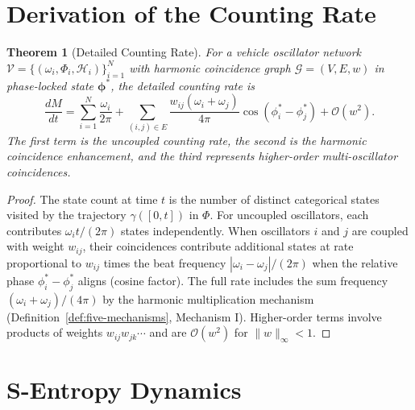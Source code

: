 \documentclass[twocolumn,10pt]{article}
\newtheorem{theorem}{Theorem}[section]
\theoremstyle{definition}
\theoremstyle{remark}
\newcommand{\Ocal}{\mathcal{O}}
\newcommand{\Gcal}{\mathcal{G}}
\begin{document}
\section{Derivation of the Counting Rate}\label{app:counting-rate}

\begin{theorem}[Detailed Counting Rate]\label{thm:detailed-rate}
For a vehicle oscillator network $\mathcal{V} = \{(\omega_i, \Phi_i,
\mathcal{H}_i)\}_{i=1}^{N}$ with harmonic coincidence graph
$\Gcal = (V, E, w)$ in phase-locked state $\bm{\phi}^*$, the detailed
counting rate is
\begin{equation}\label{eq:detailed-rate}
  \frac{dM}{dt} = \sum_{i=1}^{N} \frac{\omega_i}{2\pi}
  + \sum_{(i,j) \in E} \frac{w_{ij}(\omega_i + \omega_j)}{4\pi}
    \cos(\phi_i^* - \phi_j^*)
  + \Ocal(w^2).
\end{equation}
The first term is the uncoupled counting rate, the second is the
harmonic coincidence enhancement, and the third represents higher-order
multi-oscillator coincidences.
\end{theorem}

\begin{proof}
The state count at time $t$ is the number of distinct categorical states
visited by the trajectory $\gamma([0,t])$ in $\Phi$. For uncoupled
oscillators, each contributes $\omega_i t / (2\pi)$ states independently.
When oscillators $i$ and $j$ are coupled with weight $w_{ij}$, their
coincidences contribute additional states at rate proportional to
$w_{ij}$ times the beat frequency $|\omega_i - \omega_j|/(2\pi)$ when
the relative phase $\phi_i^* - \phi_j^*$ aligns (cosine factor). The
full rate includes the sum frequency $(\omega_i + \omega_j)/(4\pi)$ by
the harmonic multiplication mechanism
(Definition~\ref{def:five-mechanisms}, Mechanism I). Higher-order terms
involve products of weights $w_{ij} w_{jk} \cdots$ and are
$\Ocal(w^2)$ for $\|w\|_\infty < 1$.
\end{proof}


\section{S-Entropy Dynamics}\label{app:dynamics}
\end{document}
